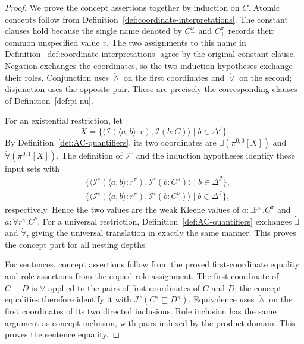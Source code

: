 \documentclass[letterpaper]{article} %
\theoremstyle{definition}
\theoremstyle{definition}
\theoremstyle{definition}
\theoremstyle{definition}
\theoremstyle{definition}
\begin{document}
\begin{proof}
We prove the concept assertions together by induction on $C$. Atomic concepts follow from Definition~\ref{def:coordinate-interpretations}. The constant clauses hold because the single name denoted by $C_{\top}^{\nu}$ and $C_{\bot}^{\pi}$ records their common unspecified value $v$. The two assignments to this name in Definition~\ref{def:coordinate-interpretations} agree by the original constant clause. Negation exchanges the coordinates, so the two induction hypotheses exchange their roles. Conjunction uses $\dot{\wedge}$ on the first coordinates and $\dot{\vee}$ on the second; disjunction uses the opposite pair. These are precisely the corresponding clauses of Definition~\ref{def:pi-nu}.

For an existential restriction, let
\[
X=\{\langle\mathcal{I}(\langle a,b\rangle:r),\mathcal{I}(b:C)\rangle\mid b\in\Delta^{\mathcal{I}}\}.
\]
By Definition~\ref{def:AC-quantifiers}, its two coordinates are $\dot{\exists}(\pi^{0,0}[X])$ and $\dot{\forall}(\pi^{0,1}[X])$. The definition of $\mathcal{I}^{\circ}$ and the induction hypotheses identify these input sets with
\begin{align*}
&\{\langle\mathcal{I}^{\circ}(\langle a,b\rangle:r^{\pi}),\mathcal{I}^{\circ}(b:C^{\pi})\rangle
       \mid b\in\Delta^{\mathcal{I}}\},\\
&\{\langle\mathcal{I}^{\circ}(\langle a,b\rangle:r^{\pi}),\mathcal{I}^{\circ}(b:C^{\nu})\rangle
       \mid b\in\Delta^{\mathcal{I}}\},
\end{align*}
respectively. Hence the two values are the weak Kleene values of $a:\exists r^{\pi}.C^{\pi}$ and $a:\forall r^{\pi}.C^{\nu}$. For a universal restriction, Definition~\ref{def:AC-quantifiers} exchanges $\dot{\exists}$ and $\dot{\forall}$, giving the universal translation in exactly the same manner. This proves the concept part for all nesting depths.

For sentences, concept assertions follow from the proved first-coordinate equality and role assertions from the copied role assignment. The first coordinate of $C\sqsubseteq D$ is $\dot{\forall}$ applied to the pairs of first coordinates of $C$ and $D$; the concept equalities therefore identify it with $\mathcal{I}^{\circ}(C^{\pi}\sqsubseteq D^{\pi})$. Equivalence uses $\dot{\wedge}$ on the first coordinates of its two directed inclusions. Role inclusion has the same argument as concept inclusion, with pairs indexed by the product domain. This proves the sentence equality.
\end{proof}
\end{document}
